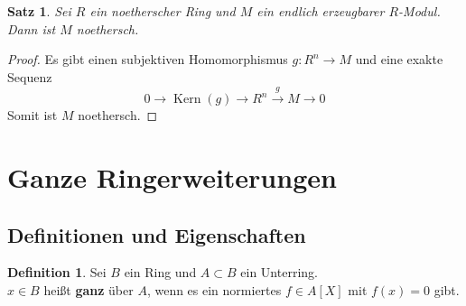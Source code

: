 \documentclass[10pt,a4paper]{article}
\newcommand{\Kern}{\operatorname{Kern}}
\theoremstyle{plain}
\newtheorem{satz}[theorem]{Satz}
\theoremstyle{definition}
\newtheorem{definition}[theorem]{Definition}
\theoremstyle{remark}
\begin{document}
	\begin{satz}
		Sei $R$ ein noetherscher Ring und $M$ ein endlich erzeugbarer $R$-Modul. Dann ist $M$ noethersch.
	\end{satz}
	\begin{proof}
		Es gibt einen subjektiven Homomorphismus $g:R^n\to M$ und eine exakte Sequenz
		\[0\to \Kern(g)\xrightarrow{ }R^n\xrightarrow{g}M\to0\]
		Somit ist $M$ noethersch.
	\end{proof}




	\section{Ganze Ringerweiterungen}
	\subsection{Definitionen und Eigenschaften}
	\begin{definition}
		Sei $B$ ein Ring und $A\subset B$ ein Unterring.\\
		$x\in B$ heißt \textbf{ganz} über $A$, wenn es ein normiertes $f\in A[X]$ mit $f(x)=0$ gibt.
	\end{definition}
\end{document}
